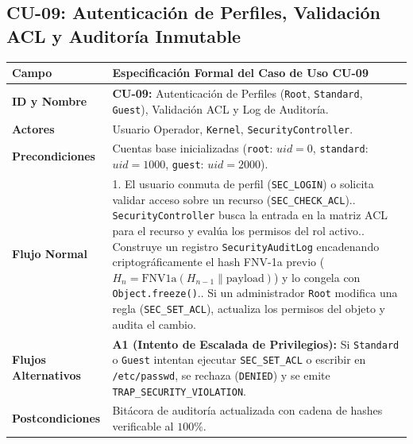 \documentclass[10pt,twocolumn,letterpaper]{article}
\begin{document}
\subsection{CU-09: Autenticaci\'on de Perfiles, Validaci\'on ACL y Auditor\'ia Inmutable}
\begin{table}[!htb]
\centering
\scriptsize
\renewcommand{\arraystretch}{1.12}
\begin{tabularx}{\columnwidth}{L{2.1cm} Y}
\toprule
\textbf{Campo} & \textbf{Especificaci\'on Formal del Caso de Uso CU-09} \\
\midrule
\textbf{ID y Nombre} & \textbf{CU-09:} Autenticaci\'on de Perfiles (\texttt{Root}, \texttt{Standard}, \texttt{Guest}), Validaci\'on ACL y Log de Auditor\'ia. \\
\textbf{Actores} & Usuario Operador, \texttt{Kernel}, \texttt{SecurityController}. \\
\textbf{Precondiciones} & Cuentas base inicializadas (\texttt{root}: $uid=0$, \texttt{standard}: $uid=1000$, \texttt{guest}: $uid=2000$). \\
\textbf{Flujo Normal} & 1. El usuario conmuta de perfil (\texttt{SEC\_LOGIN}) o solicita validar acceso sobre un recurso (\texttt{SEC\_CHECK\_ACL}).. \texttt{SecurityController} busca la entrada en la matriz ACL para el recurso y eval\'ua los permisos del rol activo.. Construye un registro \texttt{SecurityAuditLog} encadenando criptogr\'aficamente el hash FNV-1a previo ($H_n = \text{FNV1a}(H_{n-1} \parallel \text{payload})$) y lo congela con \texttt{Object.freeze()}.. Si un administrador \texttt{Root} modifica una regla (\texttt{SEC\_SET\_ACL}), actualiza los permisos del objeto y audita el cambio. \\
\textbf{Flujos Alternativos} & \textbf{A1 (Intento de Escalada de Privilegios):} Si \texttt{Standard} o \texttt{Guest} intentan ejecutar \texttt{SEC\_SET\_ACL} o escribir en \texttt{/etc/passwd}, se rechaza (\texttt{DENIED}) y se emite \texttt{TRAP\_SECURITY\_VIOLATION}. \\
\textbf{Postcondiciones} & Bit\'acora de auditor\'ia actualizada con cadena de hashes verificable al $100\%$. \\
\bottomrule
\end{tabularx}
\end{table}
\end{document}
